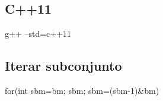 \subsection*{C++11}
\begin{code}
g++ --std=c++11
\end{code}
\subsection*{Iterar subconjunto}
\begin{code}
for(int sbm=bm; sbm; sbm=(sbm-1)&bm)
\end{code}

